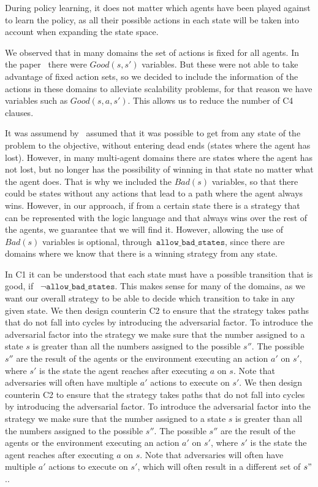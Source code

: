\documentclass[a4paper]{article}
\begin{document}
During policy learning, it does not matter which agents have been played against to learn the policy, as all their possible actions in each state will be taken into account when expanding the state space.

We observed that in many domains the set of actions is fixed for all agents. In the paper~\cite{frances2021learning} there were $Good(s, s')$ variables. But these were not able to take advantage of fixed action sets, so we decided to include the information of the actions in these domains to alleviate scalability problems, for that reason we have variables such as $Good(s, a, s')$.
 This allows us to reduce the number of C4 clauses.

It was assumend by~\cite{frances2021learning} assumed that it was possible to get from any state of the problem to the objective, without entering dead ends (states where the agent has lost). However, in many multi-agent domains there are states where the agent has not lost, but no longer has the possibility of winning in that state no matter what the agent does. That is why we included the $Bad(s)$ variables, so that there could be states without any actions that lead to a path where the agent always wins. However, in our approach, if from a certain state there is a strategy that can be represented with the logic language and that always wins over the rest of the agents, we guarantee that we will find it. However, allowing the use of $Bad(s)$ variables is optional, through~$\texttt{allow\_bad\_states}$, since there are domains where we know that there is a winning strategy from any state.

In C1 it can be understood that each state must have a possible transition that is good, if ~$\neg\texttt{allow\_bad\_states}$. This makes sense for many of the domains, as we want our overall strategy to be able to decide which transition to take in any given state. We then design counterin C2 to ensure that the strategy takes paths that do not fall into cycles by introducing the adversarial factor. To introduce the adversarial factor into the strategy we make sure that the number assigned to a state $s$ is greater than all the numbers assigned to the possible $s''$. The possible $s''$ are the result of the agents or the environment executing an action $a'$ on $s'$, where $s'$ is the state the agent reaches after executing $a$ on $s$. Note that adversaries will often have multiple $a'$ actions to execute on $s'$. We then design counterin C2 to ensure that the strategy takes paths that do not fall into cycles by introducing the adversarial factor. To introduce the adversarial factor into the strategy we make sure that the number assigned to a state $s$ is greater than all the numbers assigned to the possible $s''$. The possible $s''$ are the result of the agents or the environment executing an action $a'$ on $s'$, where $s'$ is the state the agent reaches after executing $a$ on $s$. Note that adversaries will often have multiple $a'$ actions to execute on $s'$, which will often result in a different set of $s"$..
\end{document}
